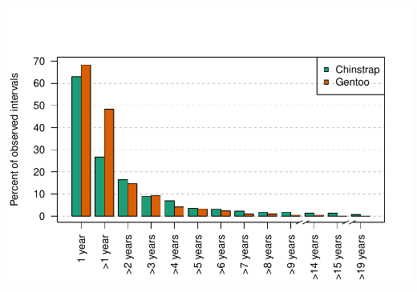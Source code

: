 \documentclass[]{elsarticle} %
\newcommand{\pandocbounded}[1]{#1}
\begin{document}
\pandocbounded{\includegraphics[keepaspectratio,alt={Frequency distribution (percent) of intervals between consecutive breeding surveys for chinstrap and gentoo penguins, taken from the supplementary data for Kruger et al 2021.}]{WattKrug_files/figure-latex/gapCheck-1.pdf}}
\end{document}
